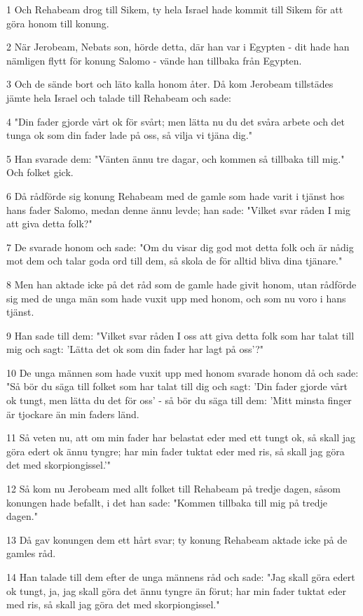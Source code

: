 \par 1 Och Rehabeam drog till Sikem, ty hela Israel hade kommit till Sikem för att göra honom till konung.
\par 2 När Jerobeam, Nebats son, hörde detta, där han var i Egypten - dit hade han nämligen flytt för konung Salomo - vände han tillbaka från Egypten.
\par 3 Och de sände bort och läto kalla honom åter. Då kom Jerobeam tillstädes jämte hela Israel och talade till Rehabeam och sade:
\par 4 "Din fader gjorde vårt ok för svårt; men lätta nu du det svåra arbete och det tunga ok som din fader lade på oss, så vilja vi tjäna dig."
\par 5 Han svarade dem: "Vänten ännu tre dagar, och kommen så tillbaka till mig." Och folket gick.
\par 6 Då rådförde sig konung Rehabeam med de gamle som hade varit i tjänst hos hans fader Salomo, medan denne ännu levde; han sade: "Vilket svar råden I mig att giva detta folk?"
\par 7 De svarade honom och sade: "Om du visar dig god mot detta folk och är nådig mot dem och talar goda ord till dem, så skola de för alltid bliva dina tjänare."
\par 8 Men han aktade icke på det råd som de gamle hade givit honom, utan rådförde sig med de unga män som hade vuxit upp med honom, och som nu voro i hans tjänst.
\par 9 Han sade till dem: "Vilket svar råden I oss att giva detta folk som har talat till mig och sagt: 'Lätta det ok som din fader har lagt på oss'?"
\par 10 De unga männen som hade vuxit upp med honom svarade honom då och sade: "Så bör du säga till folket som har talat till dig och sagt: 'Din fader gjorde vårt ok tungt, men lätta du det för oss' - så bör du säga till dem: 'Mitt minsta finger är tjockare än min faders länd.
\par 11 Så veten nu, att om min fader har belastat eder med ett tungt ok, så skall jag göra edert ok ännu tyngre; har min fader tuktat eder med ris, så skall jag göra det med skorpiongissel.'"
\par 12 Så kom nu Jerobeam med allt folket till Rehabeam på tredje dagen, såsom konungen hade befallt, i det han sade: "Kommen tillbaka till mig på tredje dagen."
\par 13 Då gav konungen dem ett hårt svar; ty konung Rehabeam aktade icke på de gamles råd.
\par 14 Han talade till dem efter de unga männens råd och sade: "Jag skall göra edert ok tungt, ja, jag skall göra det ännu tyngre än förut; har min fader tuktat eder med ris, så skall jag göra det med skorpiongissel."
